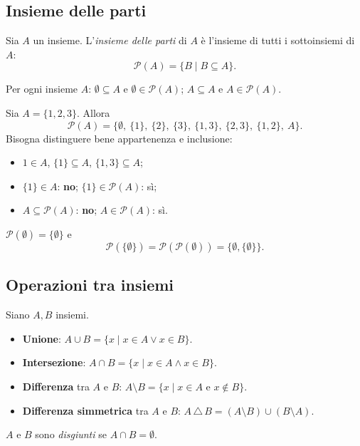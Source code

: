 \documentclass[11pt,a4paper]{article}
\begin{document}
\subsection{Insieme delle parti}

\begin{definizione}
Sia $A$ un insieme. L'\emph{insieme delle parti} di $A$ è l'insieme di
tutti i sottoinsiemi di $A$:
\[
\mathcal{P}(A) = \{B \mid B \subseteq A\}.
\]
\end{definizione}

\begin{osservazione}
Per ogni insieme $A$: $\emptyset \subseteq A$ e $\emptyset \in
\mathcal{P}(A)$; $A \subseteq A$ e $A \in \mathcal{P}(A)$.
\end{osservazione}

\begin{esempio}
Sia $A = \{1, 2, 3\}$. Allora
\[
\mathcal{P}(A) = \big\{\emptyset,\ \{1\},\ \{2\},\ \{3\},\
\{1,3\},\ \{2,3\},\ \{1,2\},\ A\big\}.
\]
Bisogna distinguere bene appartenenza e inclusione:
\begin{itemize}
    \item $1 \in A$, \quad $\{1\} \subseteq A$, \quad
          $\{1, 3\} \subseteq A$;
    \item $\{1\} \in A$: \textbf{no}; \quad $\{1\} \in \mathcal{P}(A)$:
          sì;
    \item $A \subseteq \mathcal{P}(A)$: \textbf{no}; \quad
          $A \in \mathcal{P}(A)$: sì.
\end{itemize}
\end{esempio}

\begin{esempio}
$\mathcal{P}(\emptyset) = \{\emptyset\}$ e
\[
\mathcal{P}(\{\emptyset\}) = \mathcal{P}(\mathcal{P}(\emptyset))
= \{\emptyset, \{\emptyset\}\}.
\]
\end{esempio}

\subsection{Operazioni tra insiemi}

Siano $A, B$ insiemi.

\begin{definizione}
\begin{itemize}
    \item \textbf{Unione}: $A \cup B = \{x \mid x \in A \lor x \in B\}$.
    \item \textbf{Intersezione}: $A \cap B = \{x \mid x \in A \land
          x \in B\}$.
    \item \textbf{Differenza} tra $A$ e $B$:
          $A \setminus B = \{x \mid x \in A \text{ e } x \notin B\}$.
    \item \textbf{Differenza simmetrica} tra $A$ e $B$:
          $A \,\triangle\, B = (A \setminus B) \cup (B \setminus A)$.
\end{itemize}
$A$ e $B$ sono \emph{disgiunti} se $A \cap B = \emptyset$.
\end{definizione}
\end{document}

